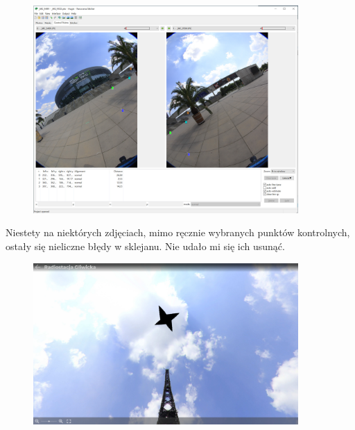 \documentclass[a4paper]{mwart}
\begin{document}
\begin{figure}[H]
\centering
\includegraphics[width=0.9\textwidth]{images/control_points.jpg}
\end{figure}

Niestety na niektórych zdjęciach, mimo ręcznie wybranych punktów kontrolnych,
ostały się nieliczne błędy w sklejanu. Nie udało mi się ich usunąć.
\begin{figure}[H]
\centering
\includegraphics[width=0.9\textwidth]{images/radiostation_error.jpg}
\end{figure}
\end{document}
